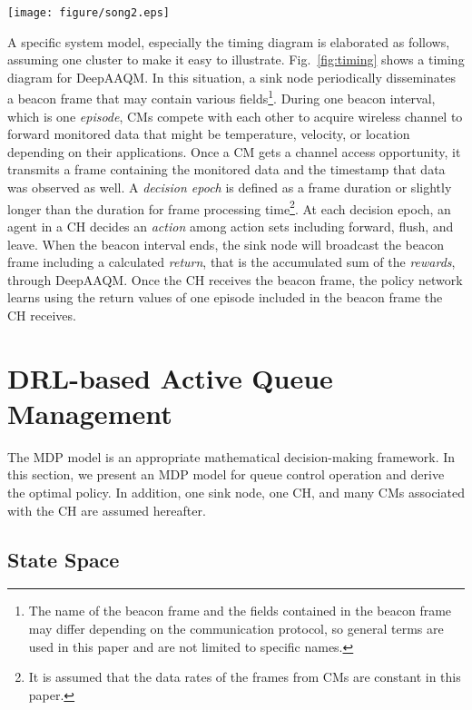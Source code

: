 \documentclass[journal]{IEEEtran}
\begin{document}
\begin{figure*}
\centering
\texttt{[image: figure/song2.eps]}
\caption{The timing diagram for DeepAAQM.}
\label{fig:timing}
\end{figure*}

A specific system model, especially the timing diagram is elaborated as follows, assuming one cluster to make it easy to illustrate. Fig.~\ref{fig:timing} shows a timing diagram for DeepAAQM. In this situation, a sink node periodically disseminates a beacon frame that may contain various fields\footnote{The name of the beacon frame and the fields contained in the beacon frame may differ depending on the communication protocol, so general terms are used in this paper and are not limited to specific names.}. 
During one beacon interval, which is one \textit{episode}, CMs compete with each other to acquire wireless channel to forward monitored data that might be temperature, velocity, or location depending on their applications.
Once a CM gets a channel access opportunity, it transmits a frame containing the monitored data and the timestamp that data was observed as well.
A \textit{decision epoch} is defined as a frame duration or slightly longer than the duration for frame processing time\footnote{It is assumed that the data rates of the frames from CMs are constant in this paper.}. At each decision epoch, an agent in a CH decides an \textit{action} among action sets including forward, flush, and leave. 
When the beacon interval ends, the sink node will broadcast the beacon frame including a calculated \textit{return}, that is the accumulated sum of the \textit{rewards}, through DeepAAQM. Once the CH receives the beacon frame, the policy network learns using the return values of one episode included in the beacon frame the CH receives.


\section{DRL-based Active Queue Management}
\label{sec:deeplesson}

The MDP model is an appropriate mathematical decision-making framework. In this section, we present an MDP model for queue control operation and derive the optimal policy. In addition, one sink node, one CH, and many CMs associated with the CH are assumed hereafter. 

\subsection{State Space}
\label{subsec:state}
\end{document}

